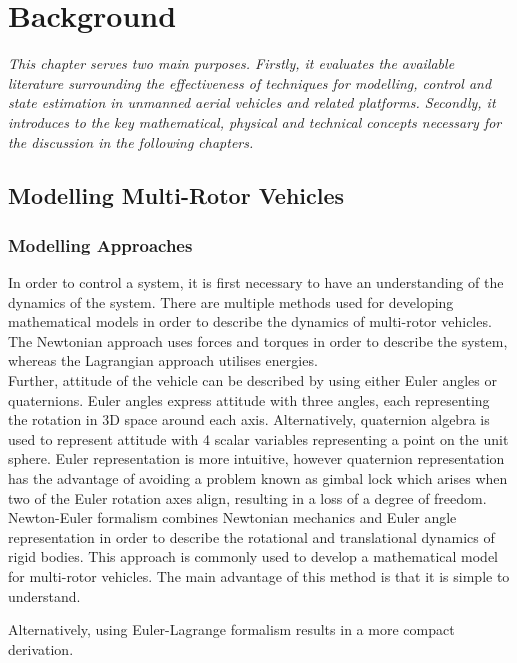 
\chapter{Background}
\textit{This chapter serves two main purposes. Firstly, it evaluates the available literature surrounding the effectiveness of techniques for modelling, control and state estimation in unmanned aerial vehicles and related platforms. Secondly, it introduces to the key mathematical, physical and technical concepts necessary for the discussion in the following chapters.}

\section{Modelling Multi-Rotor Vehicles}
\subsection{Modelling Approaches}
In order to control a system, it is first necessary to have an understanding of the dynamics of the system. There are multiple methods used for developing mathematical models in order to describe the dynamics of multi-rotor vehicles. The Newtonian approach uses forces and torques in order to describe the system, whereas the Lagrangian approach utilises energies\cite{Raine2017}.\\

 Further, attitude of the vehicle can be described by using either Euler angles or quaternions. Euler angles express attitude with three angles, each representing the rotation in 3D space around each axis. Alternatively, quaternion algebra is used to represent attitude with 4 scalar variables representing a point on the unit sphere\cite{Voight2021}. Euler representation is more intuitive, however quaternion representation has the advantage of avoiding a problem known as gimbal lock which arises when two of the Euler rotation axes align, resulting in a loss of a degree of freedom.\\

Newton-Euler formalism combines Newtonian mechanics and Euler angle representation in order to describe the rotational and translational dynamics of rigid bodies. This approach is commonly used to develop a mathematical model for multi-rotor vehicles. The main advantage of this method is that it is simple to understand. 


Alternatively, using Euler-Lagrange formalism results in a more compact derivation\cite{Zhang2014}. \\

